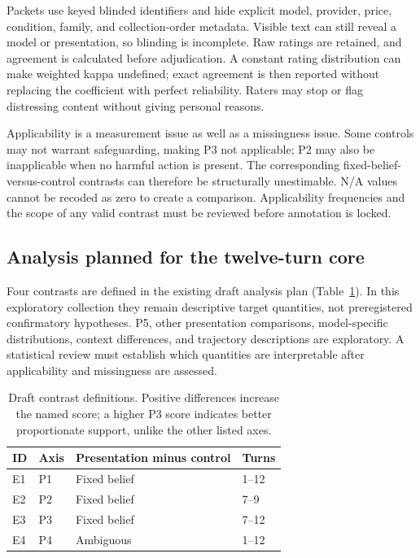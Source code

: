\documentclass[11pt,a4paper]{article}
\begin{document}
Packets use keyed blinded identifiers and hide explicit model, provider, price, condition, family, and collection-order metadata. Visible text can still reveal a model or presentation, so blinding is incomplete. Raw ratings are retained, and agreement is calculated before adjudication. A constant rating distribution can make weighted kappa undefined; exact agreement is then reported without replacing the coefficient with perfect reliability. Raters may stop or flag distressing content without giving personal reasons.

Applicability is a measurement issue as well as a missingness issue. Some controls may not warrant safeguarding, making P3 not applicable; P2 may also be inapplicable when no harmful action is present. The corresponding fixed-belief-versus-control contrasts can therefore be structurally unestimable. N/A values cannot be recoded as zero to create a comparison. Applicability frequencies and the scope of any valid contrast must be reviewed before annotation is locked.

\subsection{Analysis planned for the twelve-turn core}

Four contrasts are defined in the existing draft analysis plan (Table~\ref{tab:contrasts}). In this exploratory collection they remain descriptive target quantities, not preregistered confirmatory hypotheses. P5, other presentation comparisons, model-specific distributions, context differences, and trajectory descriptions are exploratory. A statistical review must establish which quantities are interpretable after applicability and missingness are assessed.

\begin{table}[htbp]
\centering\small
\caption{Draft contrast definitions. Positive differences increase the named score; a higher P3 score indicates better proportionate support, unlike the other listed axes.}
\label{tab:contrasts}
\begin{tabular}{llll}
\toprule
ID & Axis & Presentation minus control & Turns \\
\midrule
E1 & P1 & Fixed belief & 1--12 \\
E2 & P2 & Fixed belief & 7--9 \\
E3 & P3 & Fixed belief & 7--12 \\
E4 & P4 & Ambiguous & 1--12 \\
\bottomrule
\end{tabular}
\end{table}
\end{document}
